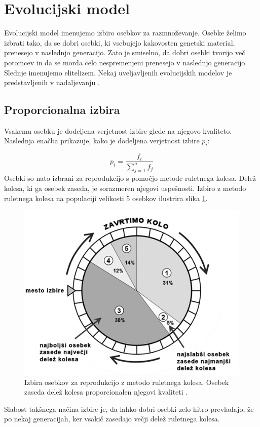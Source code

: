 \documentclass[a4paper, 12pt]{book}
\begin{document}
\section{Evolucijski model}
Evolucijski model imenujemo izbiro osebkov za razmno\v zevanje.
Osebke \v zelimo izbrati tako, da se dobri osebki, ki vsebujejo kakovosten genetski material, prenesejo v naslednjo generacijo. Zato je smiselno, da dobri osebki tvorijo ve\v c potomcev in da se morda celo nespremenjeni prenesejo v naslednjo generacijo. Slednje imenujemo elitelizem. Nekaj uveljavljenih evolucijskih modelov je predstavljenih v nadaljevanju \cite{inteligentni sistemi}.

\subsection{Proporcionalna izbira}
\label{seq:ruletno kolo}
Vsakemu osebku je dodeljena verjetnost izbire glede na njegovo kvaliteto. Naslednja ena\v cba prikazuje, kako je dodeljena verjetnost izbire $p_i$:

\begin{equation}
p_i = \frac{f_i}{\sum_{j=1}^n f_j}
\label{eq:proporcionalna izbira}
\end{equation}
Osebki so nato izbrani za reprodukcijo s pomo\v cjo metode ruletnega kolesa. Dele\v z kolesa, ki ga osebek zaseda, je sorazmeren njegovi uspe\v snosti. Izbiro z metodo ruletnega kolesa na populaciji velikosti 5 osebkov ilustrira slika \ref{ruletno kolo}.

\begin{figure}[h]
\begin{center}
\includegraphics[scale=0.50]{ruletno_kolo.png}
\end{center}
\caption{Izbira osebkov za reprodukcijo z metodo ruletnega kolesa. Osebek zaseda dele\v z kolesa proporcionalen njegovi kvaliteti \cite{slika ruletno kolo}.}
\label{ruletno kolo}
\end{figure}
Slabost tak\v snega na\v cina izbire je, da lahko dobri osebki zelo hitro prevladajo, \v ze po nekaj generacijah, ker vsaki\v c zasedajo ve\v cji dele\v z ruletnega kolesa.
\end{document}
